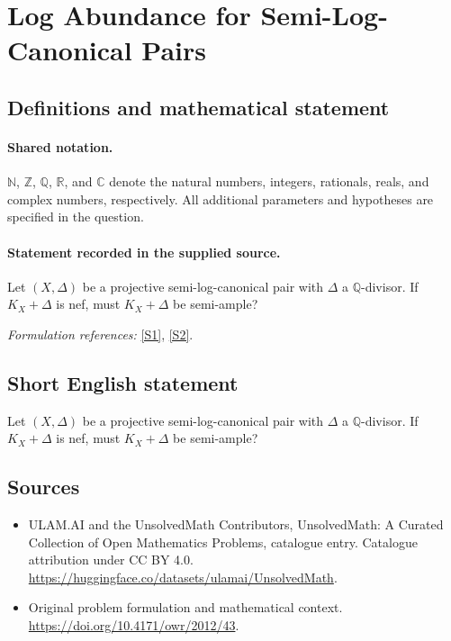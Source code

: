 \documentclass[11pt]{article}
\newcommand{\sref}[2]{\hyperlink{source:#1:#2}{[S#2]}}
\begin{document}
\section{Log Abundance for Semi-Log-Canonical Pairs}\label{statement}

\subsection{Definitions and mathematical statement}

\paragraph{Shared notation.}$\mathbb N$, $\mathbb Z$, $\mathbb Q$, $\mathbb R$, and $\mathbb C$ denote the natural numbers, integers, rationals, reals, and complex numbers, respectively. All additional parameters and hypotheses are specified in the question.


\paragraph{Statement recorded in the supplied source.}
Let $(X,\Delta)$ be a projective semi-log-canonical pair with $\Delta$ a $\mathbb Q$-divisor. If $K_X+\Delta$ is nef, must $K_X+\Delta$ be semi-ample?
\par\smallskip\textit{Formulation references:} \sref{statement}{1}, \sref{statement}{2}.
\subsection{Short English statement}
Let $(X,\Delta)$ be a projective semi-log-canonical pair with $\Delta$ a $\mathbb Q$-divisor. If $K_X+\Delta$ is nef, must $K_X+\Delta$ be semi-ample?
\subsection{Sources}
\begin{itemize}
\item[\hypertarget{source:statement:1}{S1}] ULAM.AI and the UnsolvedMath Contributors, UnsolvedMath: A Curated Collection of Open Mathematics Problems, catalogue entry. Catalogue attribution under CC BY 4.0.
\url{https://huggingface.co/datasets/ulamai/UnsolvedMath}.
\item[\hypertarget{source:statement:2}{S2}] Original problem formulation and mathematical context.
\url{https://doi.org/10.4171/owr/2012/43}.
\end{itemize}
\label{end:statement}
\end{document}
